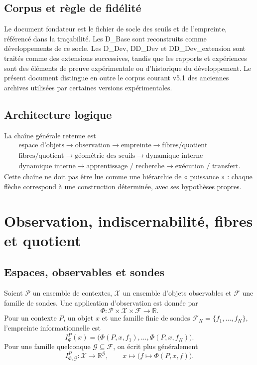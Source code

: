 \documentclass[11pt,a4paper,openany]{book}
\newcommand{\R}{\mathbb{R}}
\newcommand{\X}{\mathcal X}
\newcommand{\Pset}{\mathcal P}
\newcommand{\Fset}{\mathcal F}
\begin{document}
\section{Corpus et règle de fidélité}
Le document fondateur est le fichier de socle des seuils et de l'empreinte, référencé dans la traçabilité. Les D\_Base sont reconstruits comme développements de ce socle. Les D\_Dev, DD\_Dev et DD\_Dev\_extension sont traités comme des extensions successives, tandis que les rapports et expériences sont des éléments de preuve expérimentale ou d'historique du développement. Le présent document distingue en outre le corpus courant v5.1 des anciennes archives utilisées par certaines versions expérimentales.

\section{Architecture logique}
La chaîne générale retenue est
\[
\begin{gathered}
\text{espace d'objets}\to\text{observation}\to\text{empreinte}\to\text{fibres/quotient}\\
\text{fibres/quotient}\to\text{géométrie des seuils}\to\text{dynamique interne}\\
\text{dynamique interne}\to\text{apprentissage / recherche}\to\text{exécution / transfert}.
\end{gathered}
\]
Cette chaîne ne doit pas être lue comme une hiérarchie de « puissance » : chaque flèche correspond à une construction déterminée, avec ses hypothèses propres.

\chapter{Observation, indiscernabilité, fibres et quotient}
\section{Espaces, observables et sondes}
Soient \(\Pset\) un ensemble de contextes, \(\X\) un ensemble d'objets observables et \(\Fset\) une famille de sondes. Une application d'observation est donnée par
\[
\Phi:\Pset\times\X\times\Fset\longrightarrow\R.
\]
Pour un contexte \(P\), un objet \(x\) et une famille finie de sondes \(\Fset_K=\{f_1,\dots,f_K\}\), l'empreinte informationnelle est
\[
I_\Phi^P(x)=
\bigl(\Phi(P,x,f_1),\dots,\Phi(P,x,f_K)\bigr).
\]
Pour une famille quelconque \(\mathcal G\subseteq\Fset\), on écrit plus généralement
\[
I_{\Phi,\mathcal G}^{P}:\X\to\R^{\mathcal G},\qquad
x\mapsto\bigl(f\mapsto\Phi(P,x,f)\bigr).
\]
\end{document}
